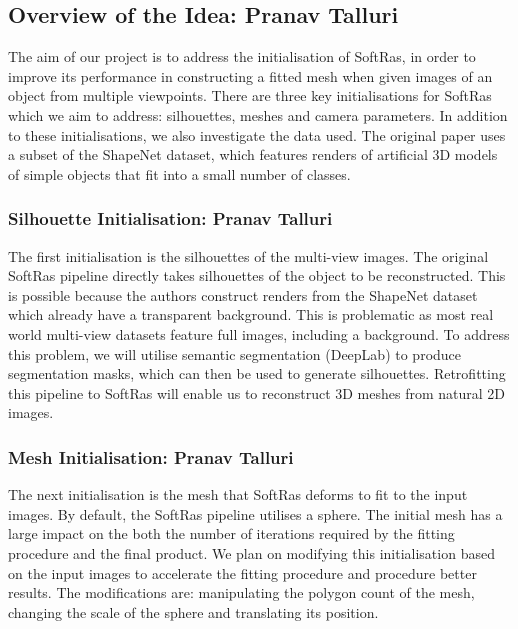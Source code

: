 \documentclass{article}
\begin{document}
\subsection{Overview of the Idea: Pranav Talluri}

The aim of our project is to address the initialisation of SoftRas, in order to improve its performance in constructing a fitted mesh when given images of an object from multiple viewpoints. There are three key initialisations for SoftRas which we aim to address: silhouettes, meshes and camera parameters. In addition to these initialisations, we also investigate the data used. The original paper uses a subset of the ShapeNet \parencite{shapenet} dataset, which features renders of artificial 3D models of simple objects that fit into a small number of classes.

\subsubsection{Silhouette Initialisation: Pranav Talluri}

The first initialisation is the silhouettes of the multi-view images. The original SoftRas pipeline directly takes silhouettes of the object to be reconstructed. This is possible because the authors construct renders from the ShapeNet dataset which already have a transparent background. This is problematic as most real world multi-view datasets feature full images, including a background. To address this problem, we will utilise semantic segmentation (DeepLab) to produce segmentation masks, which can then be used to generate silhouettes. Retrofitting this pipeline to SoftRas will enable us to reconstruct 3D meshes from natural 2D images.

\subsubsection{Mesh Initialisation: Pranav Talluri}

The next initialisation is the mesh that SoftRas deforms to fit to the input images. By default, the SoftRas pipeline utilises a sphere. The initial mesh has a large impact on the both the number of iterations required by the fitting procedure and the final product. We plan on modifying this initialisation based on the input images to accelerate the fitting procedure and procedure better results. The modifications are: manipulating the polygon count of the mesh, changing the scale of the sphere and translating its position.
\end{document}

